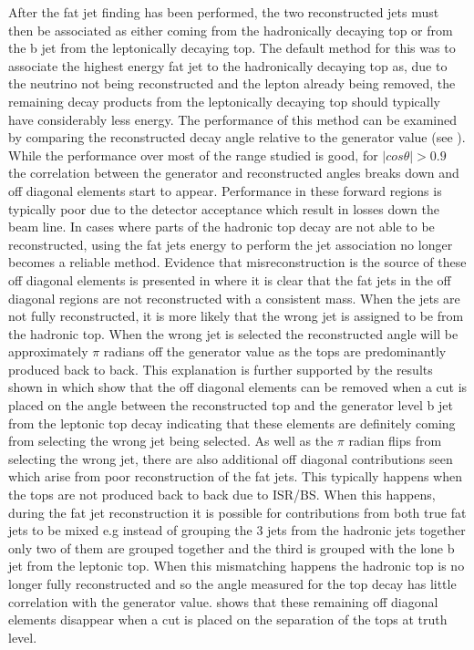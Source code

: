 After the fat jet finding has been performed, the two reconstructed jets must then be associated as either coming from the hadronically decaying top or from the b jet from the leptonically decaying top. The default method for this was to associate the highest energy fat jet to the hadronically decaying top as, due to the neutrino not being reconstructed and the lepton already being removed, the remaining decay products from the leptonically decaying top should typically have considerably less energy. The performance of this method can be examined by comparing the reconstructed decay angle relative to the generator value (see ). While the performance over most of the range studied is good, for $\mid cos\theta \mid>0.9$ the correlation between the generator and reconstructed angles breaks down and off diagonal elements start to appear. Performance in these forward regions is typically poor due to the detector acceptance which result in losses down the beam line. In cases where parts of the hadronic top decay are not able to be reconstructed, using the fat jets energy to perform the jet association no longer becomes a reliable method. Evidence that misreconstruction is the source of these off diagonal elements is presented in  where it is clear that the fat jets in the off diagonal regions are not reconstructed with a consistent mass. When the jets are not fully reconstructed, it is more likely that the wrong jet is assigned to be from the hadronic top. When the wrong jet is selected the reconstructed angle will be approximately $\pi$ radians off the generator value as the tops are predominantly produced back to back. This explanation is further supported by the results shown in  which show that the off diagonal elements can be removed when a cut is placed on the angle between the reconstructed top and the generator level b jet from the leptonic top decay indicating that these elements are definitely coming from selecting the wrong jet being selected. As well as the $\pi$ radian flips from selecting the wrong jet, there are also additional off diagonal contributions seen which arise from poor reconstruction of the fat jets. This typically happens when the tops are not produced back to back due to \ac{ISR}/\ac{BS}. When this happens, during the fat jet reconstruction it is possible for contributions from both true fat jets to be mixed e.g instead of grouping the 3 jets from the hadronic jets together only two of them are grouped together and the third is grouped with the lone b jet from the leptonic top. When this mismatching happens the hadronic top is no longer fully reconstructed and so the angle measured for the top decay has little correlation with the generator value.  shows that these remaining off diagonal elements disappear when a cut is placed on the separation of the tops at truth level. 

